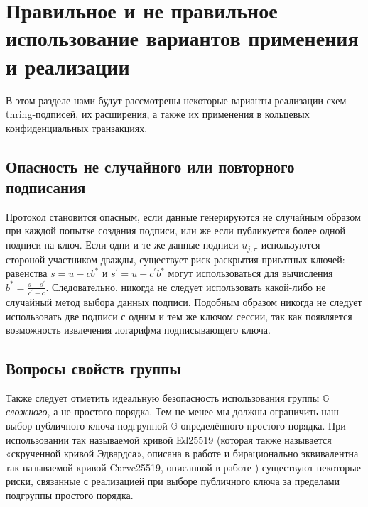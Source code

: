 \documentclass{mrl}
\theoremstyle{definition}
\numberwithin{theorem}{subsection}
\begin{document}
\section{Правильное и не правильное использование вариантов применения и реализации}

В этом разделе нами будут рассмотрены некоторые варианты реализации схем thring-подписей, их расширения, а также их применения в кольцевых конфиденциальных транзакциях. %


\subsection{Опасность не случайного или повторного подписания}

Протокол становится опасным, если данные генерируются не случайным образом при каждой попытке создания подписи, или же если публикуется более одной подписи на ключ. Если одни и те же данные подписи $u_{j,\pi}$ используются стороной-участником дважды, существует риск раскрытия приватных ключей: равенства $s = u - c b^*$ и $s^\prime = u - c^\prime b^*$ могут использоваться для вычисления $b^* = \frac{s-s^\prime}{c^\prime - c}$. Следовательно, никогда не следует использовать какой-либо не случайный метод выбора данных подписи. Подобным образом никогда не следует использовать две подписи с одним и тем же ключом сессии, так как появляется возможность извлечения логарифма подписывающего ключа.

\subsection{Вопросы свойств группы}

Также следует отметить идеальную безопасность использования группы $\mathbb{G}$ \textit{сложного}, а не простого порядка. Тем не менее мы должны ограничить наш выбор публичного ключа подгруппой $\mathbb{G}$ определённого простого порядка. При использовании так называемой кривой Ed25519 (которая также называется «скрученной кривой Эдвардса», описана в работе \cite{bernstein2012high} и бирационально эквивалентна так называемой кривой Curve25519, описанной в работе \cite{bernstein2006curve25519}) существуют некоторые риски, связанные с реализацией при выборе публичного ключа за пределами подгруппы простого порядка.
\end{document}
